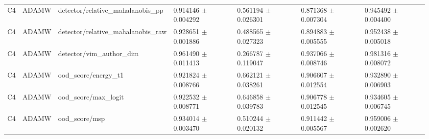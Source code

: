 \begin{longtable}{lllllll}
C4 & ADAMW & detector/relative\_mahalanobis\_pp & 0.914146 $\pm$ 0.004292 & 0.561194 $\pm$ 0.026301 & 0.871368 $\pm$ 0.007304 & 0.945492 $\pm$ 0.004400 \\
C4 & ADAMW & detector/relative\_mahalanobis\_raw & 0.928651 $\pm$ 0.001886 & 0.488565 $\pm$ 0.027323 & 0.894883 $\pm$ 0.005555 & 0.952438 $\pm$ 0.005018 \\
C4 & ADAMW & detector/vim\_author\_dim & 0.961490 $\pm$ 0.011413 & 0.266787 $\pm$ 0.119047 & 0.937066 $\pm$ 0.008746 & 0.981316 $\pm$ 0.008072 \\
C4 & ADAMW & ood\_score/energy\_t1 & 0.921824 $\pm$ 0.008766 & 0.662121 $\pm$ 0.038261 & 0.906607 $\pm$ 0.012554 & 0.932890 $\pm$ 0.006903 \\
C4 & ADAMW & ood\_score/max\_logit & 0.922532 $\pm$ 0.008771 & 0.646858 $\pm$ 0.039783 & 0.906778 $\pm$ 0.012545 & 0.934605 $\pm$ 0.006745 \\
C4 & ADAMW & ood\_score/msp & 0.934014 $\pm$ 0.003470 & 0.510244 $\pm$ 0.020132 & 0.911442 $\pm$ 0.005567 & 0.959006 $\pm$ 0.002620 \\
\end{longtable}
